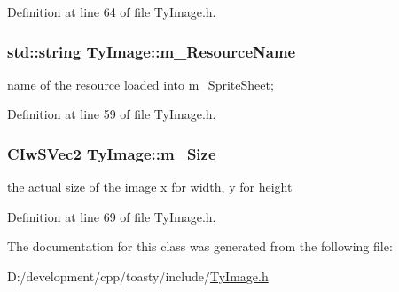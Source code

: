 Definition at line 64 of file TyImage.h.

\hypertarget{class_ty_image_aabd5f1076f03127120cfbe3360331b0c}{
\subsubsection[{m\_\-ResourceName}]{\setlength{\rightskip}{0pt plus 5cm}std::string {\bf TyImage::m\_\-ResourceName}}}
\label{class_ty_image_aabd5f1076f03127120cfbe3360331b0c}
name of the resource loaded into m\_\-SpriteSheet; 

Definition at line 59 of file TyImage.h.

\hypertarget{class_ty_image_a1a2f362a92fb810372f9d4caedaf9f3f}{
\subsubsection[{m\_\-Size}]{\setlength{\rightskip}{0pt plus 5cm}CIwSVec2 {\bf TyImage::m\_\-Size}}}
\label{class_ty_image_a1a2f362a92fb810372f9d4caedaf9f3f}
the actual size of the image x for width, y for height 

Definition at line 69 of file TyImage.h.



The documentation for this class was generated from the following file:\begin{DoxyCompactItemize}
\item 
D:/development/cpp/toasty/include/\hyperlink{_ty_image_8h}{TyImage.h}\end{DoxyCompactItemize}
